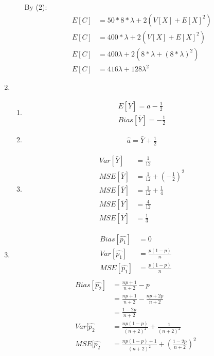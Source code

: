 \documentclass{article}
\begin{document}
\begin{enumerate}
\begin{enumerate}
By (2):
\begin{equation*}
\begin{split}
E[C] &= 50*8*\lambda + 2(V[X]+E[X]^{2}) \\
E[C] &= 400*\lambda + 2(V[X]+E[X]^{2}) \\
E[C] &= 400\lambda + 2(8*\lambda + (8*\lambda)^{2})\\
E[C] &= 416\lambda+128\lambda^{2}
\end{split}
\end{equation*}
\end{enumerate}
\item
\begin{enumerate}
\item
\begin{equation*}
\begin{split}
E[\bar{Y}] = a-\frac{1}{2} \\
Bias[\bar{Y}] = -\frac{1}{2}
\end{split}
\end{equation*}
\item
\begin{equation*}
\begin{split}
\hat{a} = \bar{Y} + \frac{1}{2}
\end{split}
\end{equation*}
\item
\begin{equation*}
\begin{split}
Var[\bar{Y}] &= \frac{1}{12} \\
MSE[\bar{Y}] &= \frac{1}{12} + (-\frac{1}{2})^{2} \\
MSE[\bar{Y}] &= \frac{1}{12} + \frac{1}{4} \\
MSE[\bar{Y}] &= \frac{4}{12} \\
MSE[\bar{Y}] &= \frac{1}{3}
\end{split}
\end{equation*}
\end{enumerate}
\item
\begin{equation*}
\begin{split}
Bias[\hat{p_{1}}] &= 0 \\
Var[\hat{p_{1}}] &= \frac{p(1-p)}{n} \\
MSE[\hat{p_{1}}] &= \frac{p(1-p)}{n} \\
\end{split}
\end{equation*}
\begin{equation*}
\begin{split}
Bias[\hat{p_{2}}] &= \frac{np+1}{n+2} - p \\
&= \frac{np+1}{n+2} - \frac{np + 2p}{n+2} \\
&= \frac{1-2p}{n+2} \\
Var[\hat{p_{2}} & = \frac{np(1-p)}{(n+2)^{2}}+\frac{1}{(n+2)^{2}} \\
MSE[\hat{p_{2}} &= \frac{np(1-p)+1}{(n+2)^{2}}+(\frac{1-2p}{n+2})^{2} \\
\end{split}
\end{equation*}
\end{enumerate}
\end{document}
